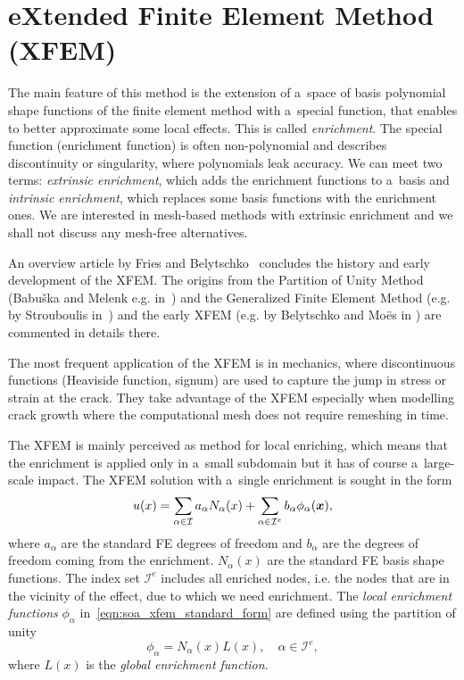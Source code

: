 
\section{eXtended Finite Element Method (XFEM)} \label{sec:soa_xfem}

The main feature of this method is the extension of a~space of basis polynomial shape functions of the finite element
method with a~special function, that enables to better approximate some local effects. This is called \emph{enrichment}.
The special function (enrichment function) is often non-polynomial and describes discontinuity or singularity,
where polynomials leak accuracy. We can meet two terms: \emph{extrinsic enrichment}, which adds the enrichment
functions to a~basis and \emph{intrinsic enrichment}, which replaces some basis functions with the enrichment ones.
We are interested in mesh-based methods with extrinsic enrichment and we shall not discuss any mesh-free alternatives.

An overview article by Fries and Belytschko~\cite{fries_xfem_overview_2010} concludes the history and early development
of the XFEM. The origins from the Partition of Unity Method (Babu{\v s}ka and Melenk e.g. in~\cite{babuska_partition_1997}) and
the Generalized Finite Element Method (e.g. by Strouboulis in~\cite{strouboulis_generalized_2000}) 
and the early XFEM (e.g. by Belytschko and Mo{\"e}s in \cite{moes_finite_1999}) are commented in details there.

The most frequent application of the XFEM is in mechanics, where discontinuous functions (Heaviside function, signum)
are used to capture the jump in stress or strain at the crack. They take advantage of the XFEM especially when 
modelling crack growth where the computational mesh does not require remeshing in time.

The XFEM is mainly perceived as method for local enriching, which means that the enrichment is applied only
in a~small subdomain but it has of course a~large-scale impact.
The XFEM solution with a~single enrichment is sought in the form
\begin{equation} \label{eqn:soa_xfem_standard_form}
  u(x) = \sum_{\alpha\in\mathcal{I}}a_\alpha N_\alpha(x)
    + \sum_{\alpha\in\mathcal{I}^e} b_{\alpha} \phi_{\alpha}(\mathbf{\boldsymbol{x}}),
\end{equation}
where $a_\alpha$ are the standard FE degrees of freedom and $b_{\alpha}$ are the degrees of freedom coming from
the enrichment. $N_\alpha(x)$ are the standard FE basis shape functions. The index set $\mathcal{I}^e$ includes 
all enriched nodes, i.e. the nodes that are in the vicinity of the effect, due to which we need enrichment.
The \emph{local enrichment functions} $\phi_{\alpha}$ in~\eqref{eqn:soa_xfem_standard_form} are defined
using the partition of unity
\begin{equation} \label{eqn:soa_xfem_enrich}
    \phi_{\alpha} = N_\alpha(x)L(x), \quad \alpha\in\mathcal{I}^e,
\end{equation}
where $L(x)$ is the \emph{global enrichment function}.

